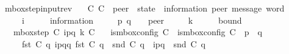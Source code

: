 \begin{isabellebody}
\isanewline
%
\endisadelimproof
\isanewline
{}\isamarkupfalse%
\ mbox{\isacharunderscore}{\kern0pt}step{\isacharunderscore}{\kern0pt}input{\isacharunderscore}{\kern0pt}rev{\isacharcolon}{\kern0pt}\isanewline
\ \ \ C{}\ C{}\ {\isacharcolon}{\kern0pt}{\isacharcolon}{\kern0pt}\ {\isachardoublequoteopen}{\isacharprime}{\kern0pt}peer\ {\isasymRightarrow}\ {\isacharparenleft}{\kern0pt}{\isacharprime}{\kern0pt}state\ {\isasymtimes}\ {\isacharparenleft}{\kern0pt}{\isacharprime}{\kern0pt}information{\isacharcomma}{\kern0pt}\ {\isacharprime}{\kern0pt}peer{\isacharparenright}{\kern0pt}\ message\ word{\isacharparenright}{\kern0pt}{\isachardoublequoteclose}\isanewline
\ \ \ \ \ i\ \ \ \ \ {\isacharcolon}{\kern0pt}{\isacharcolon}{\kern0pt}\ {\isachardoublequoteopen}{\isacharprime}{\kern0pt}information{\isachardoublequoteclose}\isanewline
\ \ \ \ \ p\ q\ \ \ {\isacharcolon}{\kern0pt}{\isacharcolon}{\kern0pt}\ {\isachardoublequoteopen}{\isacharprime}{\kern0pt}peer{\isachardoublequoteclose}\isanewline
\ \ \ \ \ k\ \ \ \ \ {\isacharcolon}{\kern0pt}{\isacharcolon}{\kern0pt}\ {\isachardoublequoteopen}bound{\isachardoublequoteclose}\isanewline
\ \ \ {\isachardoublequoteopen}mbox{\isacharunderscore}{\kern0pt}step\ C{}\ {\isacharparenleft}{\kern0pt}{\isacharquery}{\kern0pt}{\isasymlangle}{\isacharparenleft}{\kern0pt}i\isactrlbsup p{\isasymrightarrow}q\isactrlesup {\isacharparenright}{\kern0pt}{\isasymrangle}{\isacharparenright}{\kern0pt}\ k\ C{}{\isachardoublequoteclose}\isanewline
\ \ \ {\isachardoublequoteopen}is{\isacharunderscore}{\kern0pt}mbox{\isacharunderscore}{\kern0pt}config\ C{}{\isachardoublequoteclose}\ \ {\isachardoublequoteopen}is{\isacharunderscore}{\kern0pt}mbox{\isacharunderscore}{\kern0pt}config\ C{}{\isachardoublequoteclose}\ \ {\isachardoublequoteopen}p\ {\isasymnoteq}\ q{\isachardoublequoteclose}\isanewline
\ \ \ \ \ {\isachardoublequoteopen}fst\ {\isacharparenleft}{\kern0pt}C{}\ q{\isacharparenright}{\kern0pt}\ {\isasymmidarrow}{\isacharquery}{\kern0pt}{\isasymlangle}{\isacharparenleft}{\kern0pt}i\isactrlbsup p{\isasymrightarrow}q\isactrlesup {\isacharparenright}{\kern0pt}{\isasymrangle}{\isasymrightarrow}q\ {\isacharparenleft}{\kern0pt}fst\ {\isacharparenleft}{\kern0pt}C{}\ q{\isacharparenright}{\kern0pt}{\isacharparenright}{\kern0pt}{\isachardoublequoteclose}\ \ {\isachardoublequoteopen}{\isacharparenleft}{\kern0pt}snd\ {\isacharparenleft}{\kern0pt}C{}\ q{\isacharparenright}{\kern0pt}{\isacharparenright}{\kern0pt}\ {\isacharequal}{\kern0pt}\ {\isacharbrackleft}{\kern0pt}i\isactrlbsup p{\isasymrightarrow}q\isactrlesup {\isacharbrackright}{\kern0pt}\ {\isasymcdot}\ snd\ {\isacharparenleft}{\kern0pt}C{}\ q{\isacharparenright}{\kern0pt}{\isachardoublequoteclose}\isanewline

\end{isabellebody}
